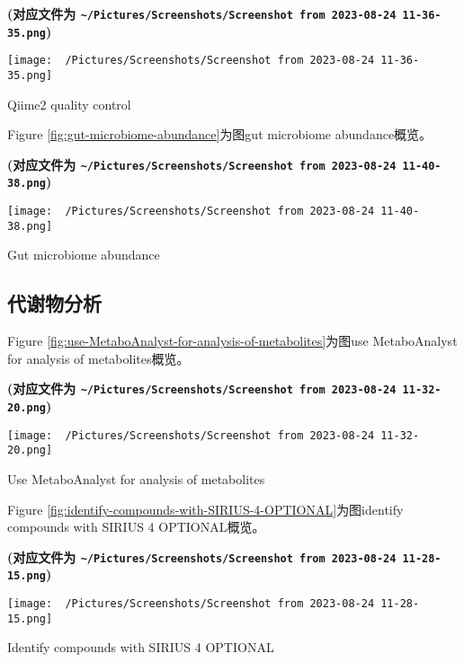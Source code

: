 \documentclass[
]{article}
\begin{document}
\textbf{(对应文件为 \texttt{\textasciitilde{}/Pictures/Screenshots/Screenshot\ from\ 2023-08-24\ 11-36-35.png})}

\def\@captype{figure}
\begin{center}
\texttt{[image: ~/Pictures/Screenshots/Screenshot from 2023-08-24 11-36-35.png]}
\caption{Qiime2 quality control}\label{fig:qiime2-quality-control}
\end{center}

Figure \ref{fig:gut-microbiome-abundance}为图gut microbiome abundance概览。

\textbf{(对应文件为 \texttt{\textasciitilde{}/Pictures/Screenshots/Screenshot\ from\ 2023-08-24\ 11-40-38.png})}

\def\@captype{figure}
\begin{center}
\texttt{[image: ~/Pictures/Screenshots/Screenshot from 2023-08-24 11-40-38.png]}
\caption{Gut microbiome abundance}\label{fig:gut-microbiome-abundance}
\end{center}

\hypertarget{ux4ee3ux8c22ux7269ux5206ux6790}{%
\subsection{代谢物分析}\label{ux4ee3ux8c22ux7269ux5206ux6790}}

Figure \ref{fig:use-MetaboAnalyst-for-analysis-of-metabolites}为图use MetaboAnalyst for analysis of metabolites概览。

\textbf{(对应文件为 \texttt{\textasciitilde{}/Pictures/Screenshots/Screenshot\ from\ 2023-08-24\ 11-32-20.png})}

\def\@captype{figure}
\begin{center}
\texttt{[image: ~/Pictures/Screenshots/Screenshot from 2023-08-24 11-32-20.png]}
\caption{Use MetaboAnalyst for analysis of metabolites}\label{fig:use-MetaboAnalyst-for-analysis-of-metabolites}
\end{center}

Figure \ref{fig:identify-compounds-with-SIRIUS-4-OPTIONAL}为图identify compounds with SIRIUS 4 OPTIONAL概览。

\textbf{(对应文件为 \texttt{\textasciitilde{}/Pictures/Screenshots/Screenshot\ from\ 2023-08-24\ 11-28-15.png})}

\def\@captype{figure}
\begin{center}
\texttt{[image: ~/Pictures/Screenshots/Screenshot from 2023-08-24 11-28-15.png]}
\caption{Identify compounds with SIRIUS 4 OPTIONAL}\label{fig:identify-compounds-with-SIRIUS-4-OPTIONAL}
\end{center}
\end{document}
